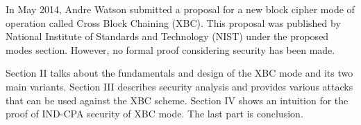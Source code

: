 \documentclass[conference]{IEEEtran}
\begin{document}
In May 2014, Andre Watson submitted a proposal for a new block cipher mode of operation called Cross Block Chaining (XBC). This proposal was published by National Institute of Standards and Technology (NIST) under the proposed modes section. However, no formal proof considering security has been made.

Section II talks about the fundamentals and design of the XBC mode and its two main variants. Section III describes security analysis and provides various attacks that can be used against the XBC scheme. Section IV shows an intuition for the proof of IND-CPA security of XBC mode. The last part is conclusion.

%
%



%
%
\end{document}
